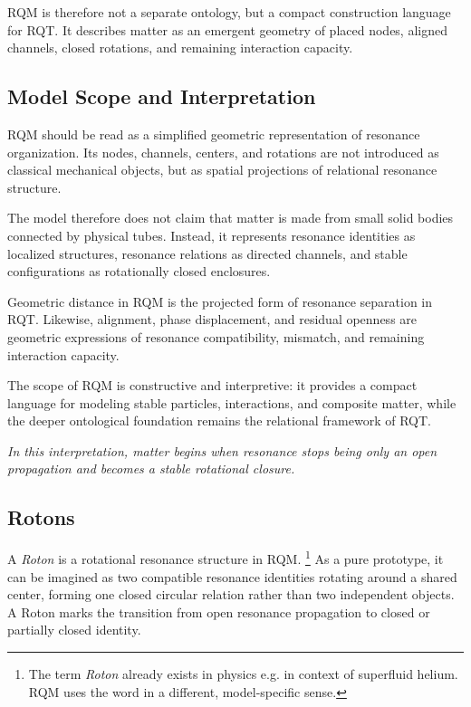 \documentclass[11pt,a4paper]{article}
\begin{document}
RQM is therefore not a separate ontology, but a compact construction language for RQT. It describes matter as an emergent geometry of placed nodes, aligned channels, closed rotations, and remaining interaction capacity.


\subsection{Model Scope and Interpretation}


RQM should be read as a simplified geometric representation of resonance organization. Its nodes, channels, centers, and rotations are not introduced as classical mechanical objects, but as spatial projections of relational resonance structure.

The model therefore does not claim that matter is made from small solid bodies connected by physical tubes. Instead, it represents resonance identities as localized structures, resonance relations as directed channels, and stable configurations as rotationally closed enclosures.

Geometric distance in RQM is the projected form of resonance separation in RQT. Likewise, alignment, phase displacement, and residual openness are geometric expressions of resonance compatibility, mismatch, and remaining interaction capacity.

The scope of RQM is constructive and interpretive: it provides a compact language for modeling stable particles, interactions, and composite matter, while the deeper ontological foundation remains the relational framework of RQT. 

\emph{In this interpretation, matter begins when resonance stops being only an open propagation and becomes a stable rotational closure.}


\subsection{Rotons}

A \emph{Roton} is a rotational resonance structure in RQM.
\footnote{%
The term \emph{Roton} already exists in physics e.g. in context of superfluid helium. RQM uses the word in a different, model-specific sense.}
As a pure prototype, it can be imagined as two compatible resonance identities rotating around a shared center, forming one closed circular relation rather than two independent objects. A Roton marks the transition from open resonance propagation to closed or partially closed identity.
\end{document}
